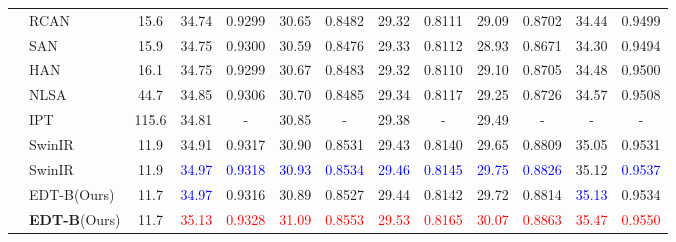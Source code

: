 \documentclass[runningheads]{llncs}
\begin{document}
\begin{table}[t]
\begin{center}
{\begin{tabular}{| c | l | c | c | c | c | c | c | c | c | c | c | c |}
					\multirow{9}{*}{} & RCAN~\cite{zhang2018image} & 15.6 & 34.74 & 0.9299 & 30.65 & 0.8482 & 29.32 & 0.8111 & 29.09 & 0.8702 & 34.44 & 0.9499 \\
					~ & SAN~\cite{dai2019second} & 15.9 & 34.75 & 0.9300 & 30.59 & 0.8476 & 29.33 & 0.8112 & 28.93 & 0.8671 & 34.30 & 0.9494 \\
~ & HAN~\cite{niu2020single} & 16.1 & 34.75 & 0.9299 & 30.67 & 0.8483 & 29.32 & 0.8110 & 29.10 & 0.8705 & 34.48 & 0.9500 \\
					~ & NLSA~\cite{mei2021image} & 44.7 & 34.85 & 0.9306 & 30.70 & 0.8485 & 29.34 & 0.8117 & 29.25 & 0.8726 & 34.57 & 0.9508 \\
					~ & IPT~\cite{chen2021pre} & 115.6 & 34.81 & - & 30.85 & - & 29.38 & - & 29.49 & - & - & - \\
					~ & SwinIR~\cite{liang2021swinir} & 11.9 & 34.91 & 0.9317 & 30.90 & 0.8531 & 29.43 & 0.8140 & 29.65 & 0.8809 & 35.05 & 0.9531 \\
					~ & SwinIR{}~\cite{liang2021swinir} & 11.9 & \textcolor{blue}{34.97} & \textcolor{blue}{0.9318} & \textcolor{blue}{30.93} & \textcolor{blue}{0.8534} & \textcolor{blue}{29.46} & \textcolor{blue}{0.8145} & \textcolor{blue}{29.75} & \textcolor{blue}{0.8826} & 35.12 & \textcolor{blue}{0.9537} \\
					~ & EDT-B(Ours) & 11.7 & \textcolor{blue}{34.97} & 0.9316 & 30.89 & 0.8527 & 29.44 & 0.8142 & 29.72 & 0.8814 & \textcolor{blue}{35.13} & 0.9534 \\
					~ & \textbf{EDT-B}(Ours) & 11.7 & \textcolor{red}{35.13} & \textcolor{red}{0.9328} & \textcolor{red}{31.09} & \textcolor{red}{0.8553} & \textcolor{red}{29.53} & \textcolor{red}{0.8165} & \textcolor{red}{30.07} & \textcolor{red}{0.8863} & \textcolor{red}{35.47} & \textcolor{red}{0.9550} \\
					\hline
					

\end{tabular}}
\end{center}
\end{table}
\end{document}
